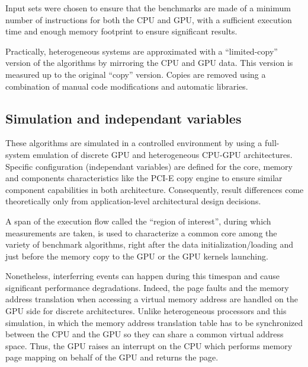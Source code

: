 \documentclass[11pt,twoside,a4paper]{article}
\begin{document}
\begin{multicols}{2}
Input sets were chosen to ensure that the benchmarks are made of a minimum
number of instructions for both the CPU and GPU, with a sufficient execution time
and enough memory footprint to ensure significant results.

Practically, heterogeneous systems are approximated with a ``limited-copy''
version of the algorithms by mirroring the CPU and GPU data. This version is
measured up to the original ``copy'' version. Copies are removed using a
combination of manual code modifications and automatic libraries.

\subsection{Simulation and independant variables}

These algorithms are simulated in a controlled environment by using a
full-system emulation of discrete GPU and heterogeneous CPU-GPU architectures.
Specific configuration (independant variables) are defined for the core, memory
and components characteristics like the PCI-E copy engine to ensure similar
component capabilities in both architecture. Consequently, result differences
come theoretically only from application-level architectural design decisions.

A span of the execution flow called the ``region of interest'', during which
measurements are taken, is used to characterize a common core among the
variety of benchmark algorithms, right after the data initialization/loading and just
before the memory copy to the GPU or the GPU kernels launching.

Nonetheless, interferring events can happen during this timespan and cause
significant performance degradations. Indeed, the page faults and the memory
address translation when accessing a virtual memory address are handled on the
GPU side for discrete architectures. Unlike heterogeneous processors and this
simulation, in which the memory address translation table has to be
synchronized between the CPU and the GPU so they can share a common virtual
address space. Thus, the GPU raises an interrupt on the CPU which performs
memory page mapping on behalf of the GPU and returns the page.


\end{multicols}
\end{document}
